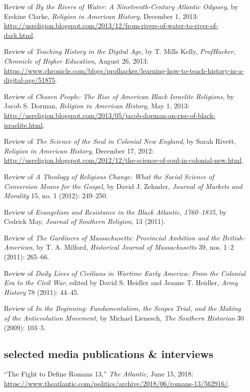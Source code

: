 \documentclass[11pt]{article}
\begin{document}
Review of \emph{By the Rivers of Water: A Nineteenth-Century Atlantic
  Odyssey}, by Erskine Clarke, \emph{Religion in American History},
December 1, 2013: 
\url{http://usreligion.blogspot.com/2013/12/from-rivers-of-water-to-river-of-dark.html}.

Review of \emph{Teaching History in the Digital Age}, by T. Mills Kelly,
\emph{ProfHacker}, \emph{Chronicle of Higher Education}, August 26,
2013: 
\url{https://www.chronicle.com/blogs/profhacker/learning-how-to-teach-history-in-a-digital-age/51875}.

Review of \emph{Chosen People: The Rise of American Black Israelite
  Religions}, by Jacob S. Dorman, \emph{Religion in American History}, May
1, 2013: 
\url{http://usreligion.blogspot.com/2013/05/jacob-dorman-on-rise-of-black-israelite.html}.

Review of \emph{The Science of the Soul in Colonial New England}, by
Sarah Rivett, \emph{Religion in American History}, December 17, 2012: 
\url{http://usreligion.blogspot.com/2012/12/the-science-of-soul-in-colonial-new.html}.

Review of \emph{A Theology of Religious Change: What the Social Science
  of Conversion Means for the Gospel}, by David J. Zehnder, \emph{Journal
  of Markets and Morality} 15, no. 1 (2012): 249--250.

Review of \emph{Evangelism and Resistance in the Black Atlantic,
  1760--1835}, by Cedrick May, \emph{Journal of Southern Religion}, 13
(2011).

Review of \emph{The Gardiners of Massachusetts: Provincial Ambition and
  the British-American}, by T. A. Milford, \emph{Historical Journal of
  Massachusetts} 39, nos. 1--2 (2011): 265--66.

Review of \emph{Daily Lives of Civilians in Wartime Early America: From
  the Colonial Era to the Civil War}, edited by David S. Heidler and
Jeanne T. Heidler, \emph{Army History} 78 (2011): 44--45.

Review of \emph{In the Beginning: Fundamentalism, the Scopes Trial, and
  the Making of the Antievolution Movement}, by Michael Lienesch,
\emph{The Southern Historian} 30 (2009): 103--5.

\subsection{selected media publications \& interviews}\label{public}

``The Fight to Define Romans 13,'' \emph{The Atlantic}, June 15, 2018: \url{https://www.theatlantic.com/politics/archive/2018/06/romans-13/562916/}.
\end{document}

